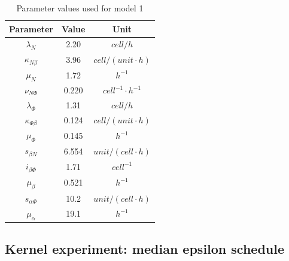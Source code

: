 \documentclass[12pt,a4paper]{report}
\begin{document}
\begin{table}[h!]
    \centering
    \begin{tabular}{|c c c|} 
     \hline
     Parameter & Value & Unit\\ [0.5ex] 
     \hline\hline
     $\lambda_N$ & 2.20 & $cell/h$  \\ 
     $\kappa_{N\beta}$ & 3.96 & $cell/(unit\cdotp h)$\\
     $\mu_N$ & 1.72 & $h^{-1}$\\
     $\nu_{N\Phi}$ & 0.220 & $cell^{-1}\cdotp h^{-1}$ \\
     \hline
     $\lambda_\Phi$ & 1.31 & $cell/h$ \\
     $\kappa_{\Phi\beta}$ & 0.124 & $cell/(unit\cdotp h)$ \\
     $\mu_\Phi$ & 0.145 & $h^{-1}$ \\
     \hline
     $s_{\beta N}$ & 6.554 & $unit/(cell\cdotp h)$ \\
     $i_{\beta\Phi}$ & 1.71 & $cell^{-1}$ \\
     $\mu_\beta$ & 0.521 & $h^{-1}$ \\
     \hline
     $s_{\alpha\Phi}$ & 10.2 & $unit/(cell\cdotp h)$ \\
     $\mu_\alpha$ & 19.1 & $h^{-1}$ \\
     \hline
    \end{tabular}
    \caption{Parameter values used for model 1}
    \label{table:m1}
\end{table}

\subsection{Kernel experiment: median epsilon schedule}
\end{document}
